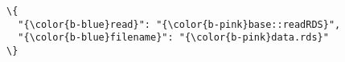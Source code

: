 \documentclass[class=minimal,border=0]{standalone}
\begin{document}
%
\begin{BVerbatim}[bgcolor=b-darkgrey]
\{
  "{\color{b-blue}read}": "{\color{b-pink}base::readRDS}",
  "{\color{b-blue}filename}": "{\color{b-pink}data.rds}"
\}
\end{BVerbatim}
\end{document}

